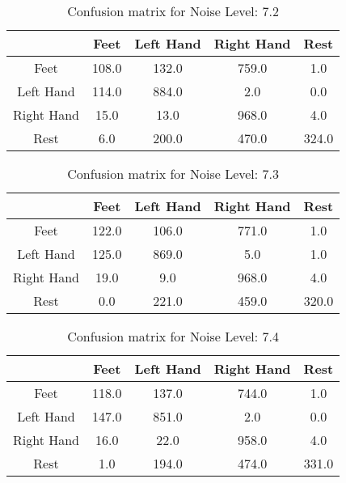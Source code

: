 \begin{table}[!htbp]
    \centering
    \begin{tabular}{|c||c|c|c|c|}
        \hline
		 & Feet & Left Hand & Right Hand & Rest \\
        \hline
        \hline
        Feet & 108.0 & 132.0 & 759.0 & 1.0 \\
        \hline
        Left Hand & 114.0 & 884.0 & 2.0 & 0.0 \\
        \hline
        Right Hand & 15.0 & 13.0 & 968.0 & 4.0 \\
        \hline
        Rest & 6.0 & 200.0 & 470.0 & 324.0 \\
        \hline
    \end{tabular}
    \caption{Confusion matrix for Noise Level: 7.2}
\end{table}

\begin{table}[!htbp]
    \centering
    \begin{tabular}{|c||c|c|c|c|}
        \hline
		 & Feet & Left Hand & Right Hand & Rest \\
        \hline
        \hline
        Feet & 122.0 & 106.0 & 771.0 & 1.0 \\
        \hline
        Left Hand & 125.0 & 869.0 & 5.0 & 1.0 \\
        \hline
        Right Hand & 19.0 & 9.0 & 968.0 & 4.0 \\
        \hline
        Rest & 0.0 & 221.0 & 459.0 & 320.0 \\
        \hline
    \end{tabular}
    \caption{Confusion matrix for Noise Level: 7.3}
\end{table}

\begin{table}[!htbp]
    \centering
    \begin{tabular}{|c||c|c|c|c|}
        \hline
		 & Feet & Left Hand & Right Hand & Rest \\
        \hline
        \hline
        Feet & 118.0 & 137.0 & 744.0 & 1.0 \\
        \hline
        Left Hand & 147.0 & 851.0 & 2.0 & 0.0 \\
        \hline
        Right Hand & 16.0 & 22.0 & 958.0 & 4.0 \\
        \hline
        Rest & 1.0 & 194.0 & 474.0 & 331.0 \\
        \hline
    \end{tabular}
    \caption{Confusion matrix for Noise Level: 7.4}
\end{table}

